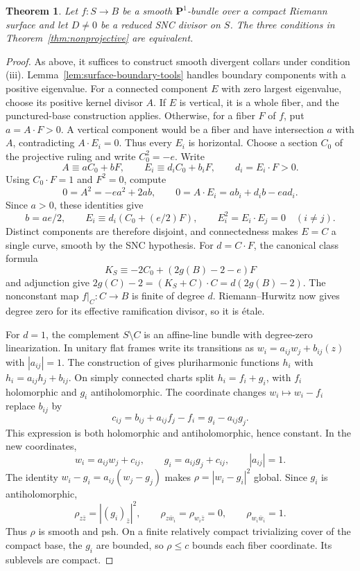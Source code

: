 \documentclass[11pt]{amsart}
\newtheorem{theorem}{Theorem}[section]
\theoremstyle{definition}
\theoremstyle{remark}
\numberwithin{equation}{section}
\newcommand{\PP}{\mathbf P}
\begin{document}
\begin{theorem}\label{cor:ruled-all-degrees}
Let $f:S\to B$ be a smooth $\PP^1$-bundle over a compact Riemann
surface and let $D\ne0$ be a reduced SNC divisor on $S$.
The three conditions in Theorem~\ref{thm:nonprojective} are equivalent.
\end{theorem}
\begin{proof}
As above, it suffices to construct smooth divergent collars under
condition \textup{(iii)}. Lemma~\ref{lem:surface-boundary-tools}
handles boundary components with a positive eigenvalue. For a connected component
$E$ with zero largest eigenvalue, choose its positive kernel divisor
$A$. If $E$ is vertical, it is a whole fiber, and the punctured-base
construction applies. Otherwise, for a fiber $F$ of $f$, put
$a=A\cdot F>0$. A vertical
component would be a fiber and have intersection $a$ with $A$,
contradicting $A\cdot E_i=0$. Thus every $E_i$ is horizontal.
Choose a section $C_0$ of the projective ruling and write $C_0^2=-e$.
Write
\[
 A\equiv aC_0+bF,\qquad E_i\equiv d_iC_0+b_iF,
 \qquad d_i=E_i\cdot F>0.
\]
Using $C_0\cdot F=1$ and $F^2=0$, compute
\[
 0=A^2=-ea^2+2ab,\qquad
 0=A\cdot E_i=a b_i+d_i b-ea d_i.
\]
Since $a>0$, these identities give
\[
 b=ae/2,\qquad E_i\equiv d_i(C_0+(e/2)F),\qquad
 E_i^2=E_i\cdot E_j=0\quad(i\ne j).
\]
Distinct components are therefore disjoint, and connectedness makes
$E=C$ a single curve, smooth by the SNC hypothesis. For
$d=C\cdot F$, the canonical class formula
\[
 K_S\equiv-2C_0+(2g(B)-2-e)F
\]
and adjunction give $2g(C)-2=(K_S+C)\cdot C=d(2g(B)-2)$.
The nonconstant map $f|_C:C\to B$ is finite of degree $d$.
Riemann--Hurwitz now gives degree zero for its effective ramification
divisor, so it is \'etale.

For $d=1$, the complement $S\setminus C$ is an affine-line bundle
with degree-zero linearization. In unitary flat frames write its
transitions as $w_i=a_{ij}w_j+b_{ij}(z)$ with $|a_{ij}|=1$.
The construction of \cite[Proposition~2.1]{KoikeUeda2025} gives
pluriharmonic functions $h_i$ with
$h_i=a_{ij}h_j+b_{ij}$. On simply connected charts split
$h_i=f_i+g_i$, with $f_i$ holomorphic and $g_i$ antiholomorphic.
The coordinate changes $w_i\mapsto w_i-f_i$ replace $b_{ij}$ by
\[
 c_{ij}=b_{ij}+a_{ij}f_j-f_i=g_i-a_{ij}g_j.
\]
This expression is both holomorphic and antiholomorphic, hence
constant. In the new coordinates,
\[
 w_i=a_{ij}w_j+c_{ij},\qquad g_i=a_{ij}g_j+c_{ij},
 \qquad |a_{ij}|=1.
\]
The identity $w_i-g_i=a_{ij}(w_j-g_j)$ makes
$\rho=|w_i-g_i|^2$ global. Since $g_i$ is antiholomorphic,
\[
 \rho_{z\bar z}=|(g_i)_{\bar z}|^2,\qquad
 \rho_{z\bar w_i}=\rho_{w_i\bar z}=0,\qquad
 \rho_{w_i\bar w_i}=1.
\]
Thus $\rho$ is smooth and psh. On a finite relatively compact
trivializing cover of the compact base, the $g_i$ are bounded, so
$\rho\le c$ bounds each fiber coordinate. Its sublevels are compact.


\end{proof}
\end{document}
